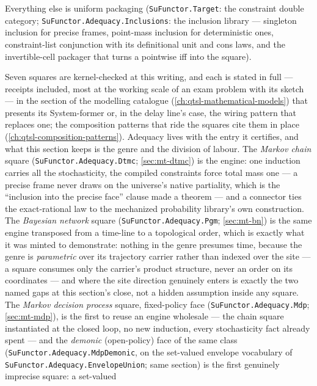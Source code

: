 {\sloppy
Everything else is uniform packaging
(\texttt{SuFunctor.Target}: the constraint double category;
\texttt{SuFunctor.Adequacy.Inclusions}: the inclusion library ---
singleton inclusion for precise frames, point-mass inclusion for
deterministic ones, constraint-list conjunction with its
definitional unit and cons laws, and the invertible-cell packager
that turns a pointwise iff into the square).\par}

Seven squares are kernel-checked at this writing, and each is
stated in full --- receipts included, most at the working scale of
an exam problem with its sketch --- in the section of the modelling
catalogue (\autoref{ch:qtsl-mathematical-models}) that presents its
System-former or, in the delay line's case, the wiring pattern that
replaces one; the composition patterns that ride the squares cite
them in place (\autoref{ch:qtsl-composition-patterns}).
Adequacy lives with the entry it certifies, and what this section
keeps is the genre and the division of labour. The \emph{Markov
chain} square (\texttt{SuFunctor.Adequacy.Dtmc};
\autoref{sec:mt-dtmc}) is the engine: one induction carries all
the stochasticity, the compiled constraints force total mass one
--- a precise frame never draws on the universe's native
partiality, which is the ``inclusion into the precise face'' clause
made a theorem --- and a connector ties the exact-rational law to
the mechanized probability library's own construction. The
\emph{Bayesian network} square (\texttt{SuFunctor.Adequacy.Pgm};
\autoref{sec:mt-bn}) is the same engine transposed from a
time-line to a topological order, which is exactly what it was
minted to demonstrate: nothing in the genre presumes time, because
the genre is \emph{parametric} over its trajectory carrier rather
than indexed over the site --- a square consumes only the carrier's
product structure, never an order on its coordinates --- and where
the site direction genuinely enters is exactly the two named gaps
at this section's close, not a hidden assumption inside any square.
The \emph{Markov decision process} square, fixed-policy face
(\texttt{SuFunctor.Adequacy.Mdp}; \autoref{sec:mt-mdp}), is the
first to reuse an engine wholesale --- the chain square
instantiated at the closed loop, no new induction, every
stochasticity fact already spent --- and the \emph{demonic}
(open-policy) face of the same class
(\texttt{SuFunctor.Adequacy.MdpDemonic}, on the set-valued envelope
vocabulary of \texttt{SuFunctor.Adequacy.EnvelopeUnion}; same
section) is the first genuinely imprecise square: a set-valued
